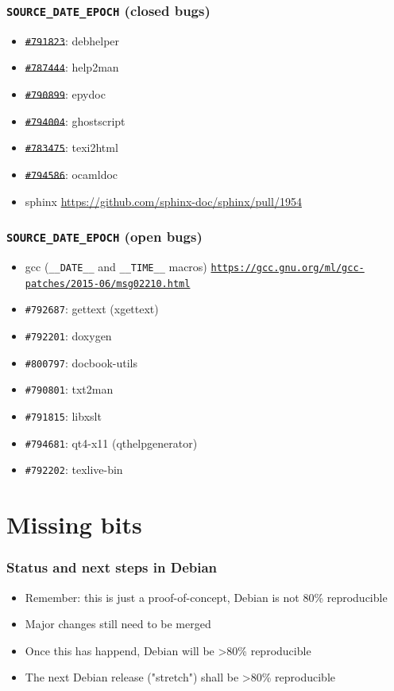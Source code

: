 \documentclass[14pt]{beamer}
\begin{document}
\begin{frame}
 \frametitle{\texttt{SOURCE\_DATE\_EPOCH} (closed bugs)}

 \begin{itemize}
  \item \sout{\texttt{\#791823}}: debhelper
  \item \sout{\texttt{\#787444}}: help2man
  \item \sout{\texttt{\#790899}}: epydoc
  \item \sout{\texttt{\#794004}}: ghostscript
  \item \sout{\texttt{\#783475}}: texi2html
  \item \sout{\texttt{\#794586}}: ocamldoc
  \item sphinx \small{\url{https://github.com/sphinx-doc/sphinx/pull/1954}}
 \end{itemize}

\end{frame}

\begin{frame}
 \frametitle{\texttt{SOURCE\_DATE\_EPOCH} (open bugs)}

 \begin{itemize}
  \item gcc (\texttt{\_\_DATE\_\_} and \texttt{\_\_TIME\_\_} macros) \texttt{\footnotesize{\url{https://gcc.gnu.org/ml/gcc-patches/2015-06/msg02210.html}}}
  \item \texttt{\#792687}: gettext (xgettext)
  \item \texttt{\#792201}: doxygen
  \item \texttt{\#800797}: docbook-utils
  \item \texttt{\#790801}: txt2man
  \item \texttt{\#791815}: libxslt
  \item \texttt{\#794681}: qt4-x11 (qthelpgenerator)
  \item \texttt{\#792202}: texlive-bin
 \end{itemize}

\end{frame}


\section{Missing bits}

\begin{frame}
 \frametitle{Status and next steps in Debian}
 \begin{itemize}
  \item Remember: this is just a proof-of-concept, Debian is not 80\%
  reproducible
  \item Major changes still need to be merged
  \item Once this has happend, Debian will be >80\% reproducible
  \item The next Debian release ("stretch") shall be >80\% reproducible
 \end{itemize}
\end{frame}
\end{document}
